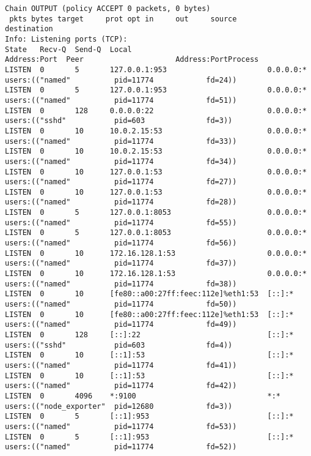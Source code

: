 \begin{longlisting}
\begin{verbatim}
Chain OUTPUT (policy ACCEPT 0 packets, 0 bytes)
 pkts bytes target     prot opt in     out     source               destination
Info: Listening ports (TCP):
State   Recv-Q  Send-Q  Local                               Address:Port  Peer                     Address:PortProcess
LISTEN  0       5       127.0.0.1:953                       0.0.0.0:*     users:(("named"          pid=11774            fd=24))
LISTEN  0       5       127.0.0.1:953                       0.0.0.0:*     users:(("named"          pid=11774            fd=51))
LISTEN  0       128     0.0.0.0:22                          0.0.0.0:*     users:(("sshd"           pid=603              fd=3))
LISTEN  0       10      10.0.2.15:53                        0.0.0.0:*     users:(("named"          pid=11774            fd=33))
LISTEN  0       10      10.0.2.15:53                        0.0.0.0:*     users:(("named"          pid=11774            fd=34))
LISTEN  0       10      127.0.0.1:53                        0.0.0.0:*     users:(("named"          pid=11774            fd=27))
LISTEN  0       10      127.0.0.1:53                        0.0.0.0:*     users:(("named"          pid=11774            fd=28))
LISTEN  0       5       127.0.0.1:8053                      0.0.0.0:*     users:(("named"          pid=11774            fd=55))
LISTEN  0       5       127.0.0.1:8053                      0.0.0.0:*     users:(("named"          pid=11774            fd=56))
LISTEN  0       10      172.16.128.1:53                     0.0.0.0:*     users:(("named"          pid=11774            fd=37))
LISTEN  0       10      172.16.128.1:53                     0.0.0.0:*     users:(("named"          pid=11774            fd=38))
LISTEN  0       10      [fe80::a00:27ff:feec:112e]%eth1:53  [::]:*        users:(("named"          pid=11774            fd=50))
LISTEN  0       10      [fe80::a00:27ff:feec:112e]%eth1:53  [::]:*        users:(("named"          pid=11774            fd=49))
LISTEN  0       128     [::]:22                             [::]:*        users:(("sshd"           pid=603              fd=4))
LISTEN  0       10      [::1]:53                            [::]:*        users:(("named"          pid=11774            fd=41))
LISTEN  0       10      [::1]:53                            [::]:*        users:(("named"          pid=11774            fd=42))
LISTEN  0       4096    *:9100                              *:*           users:(("node_exporter"  pid=12680            fd=3))
LISTEN  0       5       [::1]:953                           [::]:*        users:(("named"          pid=11774            fd=53))
LISTEN  0       5       [::1]:953                           [::]:*        users:(("named"          pid=11774            fd=52))

\end{verbatim}
\end{longlisting}
